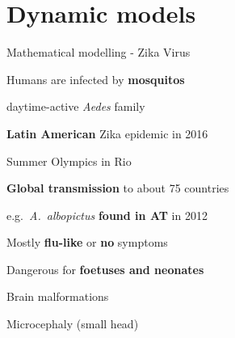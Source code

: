 \documentclass[table]{beamer}\usepackage[]{graphicx}\usepackage[]{color}
\begin{document}
\section{Dynamic models}
\begin{frame}[fragile]{Mathematical modelling - Zika Virus} %

\begin{minipage}{.6\textwidth}
Humans are infected by \textbf{mosquitos} \par
\hspace*{0.5cm} daytime-active \textit{Aedes} family \par
\vspace{0.3cm}
\textbf{Latin American} Zika epidemic in 2016 \par
\vspace{0.1cm}
\hspace*{0.5cm} Summer Olympics in Rio \par %
\vspace{0.1cm}
\hspace*{0.5cm} \textbf{Global transmission} to about 75 countries \par
\vspace{0.1cm}
\hspace*{0.5cm} e.g.\ \textit{A.\ albopictus} \textbf{found in AT} in 2012 \par
\vspace{0.3cm} 
Mostly \textbf{flu-like} or \textbf{no} symptoms \par
\vspace{0.3cm} 
Dangerous for \textbf{foetuses and neonates} \par
\vspace{0.1cm}
\hspace*{0.5cm} Brain malformations \par
\vspace{0.1cm}
\hspace*{0.5cm} Microcephaly (small head)


\end{minipage}
\end{frame}
\end{document}
